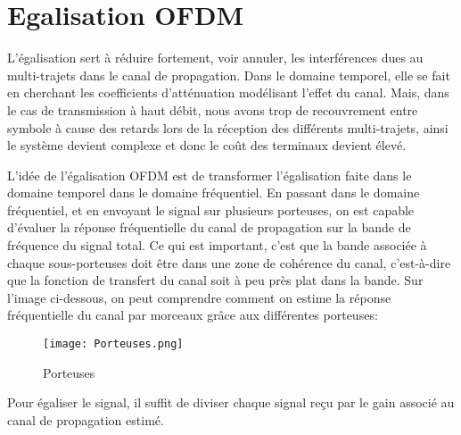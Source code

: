 
\chapter{Egalisation OFDM}

L’égalisation sert à réduire fortement, voir annuler, les interférences dues au
multi-trajets dans le canal de propagation. Dans le domaine temporel, elle se
fait en cherchant les coefficients d’atténuation modélisant l’effet du canal.
Mais, dans le cas de transmission à haut débit, nous avons trop de recouvrement
entre symbole à cause des retards lors de la réception des différents
multi-trajets, ainsi le système devient complexe et donc le coût des terminaux
devient élevé.

L’idée de l’égalisation OFDM est de transformer l’égalisation faite dans le
domaine temporel dans le domaine fréquentiel. En passant dans le domaine
fréquentiel, et en envoyant le signal sur plusieurs porteuses, on est capable
d’évaluer la réponse fréquentielle du canal de propagation sur la bande de
fréquence du signal total. Ce qui est important, c’est que la bande associée à
chaque sous-porteuses doit être dans une zone de cohérence du canal,
c’est-à-dire que la fonction de transfert du canal soit à peu près plat dans la
bande.  Sur l’image ci-dessous, on peut comprendre comment on estime la réponse
fréquentielle du canal par morceaux grâce aux différentes porteuses:

\begin{figure}[!h]
  \centering
  \texttt{[image: Porteuses.png]}
  \caption{Porteuses}
\end{figure}

Pour égaliser le signal, il suffit de diviser chaque signal reçu par le gain
associé au canal de propagation estimé.

